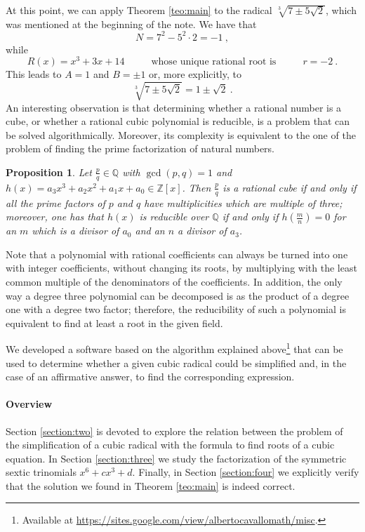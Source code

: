 \documentclass[11pt,a4paper]{article}
\numberwithin{equation}{section}
\newcommand{\Z}{\mathbb{Z}}
\newcommand{\Q}{\mathbb{Q}}
\newtheorem{prop}[teo]{Proposition}
\theoremstyle{definition}
\begin{document}
At this point, we can apply Theorem \ref{teo:main} to the radical $\sqrt[3]{7\pm5\sqrt 2}$, which was mentioned at the beginning of the note. We have that \[N=7^2-5^2\cdot2=-1\:,\] while \[R(x)=x^3+3x+14\hspace{1cm}\text{ whose unique rational root is }\hspace{1cm}r=-2\:.\] This leads to $A=1$ and $B=\pm1$ or, more explicitly, to \[\sqrt[3]{7\pm5\sqrt 2}=1\pm\sqrt2\:.\]  
An interesting observation is that determining whether a rational number is a cube, or whether a rational cubic polynomial is reducible, is a problem that can be solved algorithmically. Moreover, its complexity is equivalent to the one of the problem of finding the prime factorization of natural numbers. 
\begin{prop}
 Let $\frac{p}{q}\in\Q$ with $\gcd(p,q)=1$ and $h(x)=a_3x^3+a_2x^2+a_1x+a_0\in\Z[x]$. Then $\frac{p}{q}$ is a rational cube if and only if all the prime factors of $p$ and $q$ have multiplicities which are multiple of three; moreover, one has that $h(x)$ is reducible over $\Q$ if and only if $h(\frac{m}{n})=0$ for an $m$ which is a divisor of $a_0$ and an $n$ a divisor of $a_3$.
\end{prop}
Note that a polynomial with rational coefficients can always be turned into one with integer coefficients, without changing its roots, by multiplying with the least common multiple of the denominators of the coefficients. In addition, the only way a degree three polynomial can be decomposed is as the product of a degree one with a degree two factor; therefore, the reducibility of such a polynomial is equivalent to find at least a root in the given field.  

We developed a software based on the algorithm explained above\footnote{Available at  \url{https://sites.google.com/view/albertocavallomath/misc}.} that can be used to determine whether a given cubic radical could be simplified and, in the case of an affirmative answer, to find the corresponding expression.

\paragraph*{Overview}
Section \ref{section:two} is devoted to explore the relation between the problem of the simplification of a cubic radical with the formula to find roots of a cubic equation. In Section \ref{section:three} we study the factorization of the symmetric sextic trinomials $x^6+cx^3+d$. Finally, in Section \ref{section:four} we explicitly verify that the solution we found in Theorem \ref{teo:main} is indeed correct.
\end{document}
